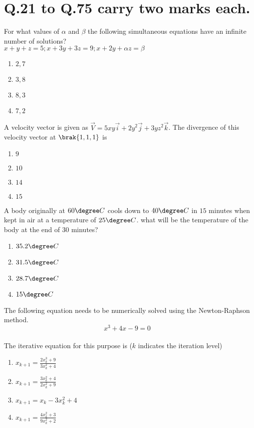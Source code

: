 		\section*{Q.21 to Q.75 carry two marks each.}
\item For what values of $\alpha$ and $\beta$ the following simultaneous equations have an infinite number of solutions?\\ $x+y+z=5;  x+3y+3z=9;  x+2y+\alpha z= \beta$
	\begin{enumerate}
                \item $2,7$
                \item $3,8$
                \item $8,3$
                \item $7,2$
        \end{enumerate}
\item A velocity vector is given as $\vec{V}= 5xy\overrightarrow{i}+2y^2\overrightarrow{j}+3yz^2\overrightarrow{k}$. The divergence of this velocity vector at $\brak{1,1,1}$ is
	\begin{enumerate}
                \item $9$
                \item $10$
                \item $14$
                \item $15$
        \end{enumerate}
\item A body originally at $60{\degree}C$ cools down to $40{\degree}C$ in $15$ minutes when kept in air at a temperature of $25{\degree}C$. what will be the temperature of the body at the end of $30$ minutes?
	\begin{enumerate}
		\item $35.2{\degree}C$
                \item $31.5{\degree}C$
                \item $28.7{\degree}C$
                \item $15{\degree}C$
        \end{enumerate}
\item The following equation needs to be numerically solved using the Newton-Raphson method.\\ $$x^3+4x-9=0$$\\The iterative equation for this purpose is ($k$ indicates the iteration level)
	\begin{enumerate}
		\item $x_{k+1}=\frac{2x_k^3+9}{3x_k^2+4}$
		\item $x_{k+1}=\frac{3x_k^2+4}{2x_k^2+9}$
		\item $x_{k+1}=x_k-3x_k^2+4$
		\item $x_{k+1}=\frac{4x_k^2+3}{9x_k^2+2}$
        \end{enumerate}   
